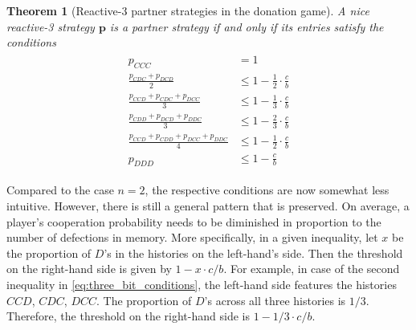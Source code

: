 \documentclass[9pt,twoside,lineno]{pnas-new}
\theoremstyle{plainCl1}
\newtheorem{theorem}{Theorem}
\newtheorem{corollary}{Corollary}
\theoremstyle{plainCl2}
\begin{document}
\begin{theorem}[Reactive-3 partner strategies in the donation game]\label{theorem:reactive_three_partner_strategies}
A nice reactive-3 strategy $\mathbf{p}$ is a partner strategy if and only if its entries satisfy the conditions
\begin{align}\label{eq:three_bit_conditions}
  \begin{split}
  p_{CCC} & = 1 \\
  \frac{p_{CDC} + p_{DCD}}{2} & \leq 1 - \frac{1}{2} \cdot \frac{c}{b} \\
  \frac{p_{CCD} + p_{CDC} + p_{DCC}}{3} & \leq 1 - \frac{1}{3} \cdot \frac{c}{b} \\
  \frac{p_{CDD} + p_{DCD} + p_{DDC}}{3} & \leq 1 - \frac{2}{3} \cdot \frac{c}{b} \\
  \frac{p_{CCD} + p_{CDD} + p_{DCC} + p_{DDC}}{4}  & \leq 1 - \frac{1}{2} \cdot \frac{c}{b}  \\
  p_{DDD} & \leq 1\!-\! \frac{c}{b}
  \end{split}
\end{align}
\end{theorem}

\noindent
Compared to the case $n\!=\!2$, the respective conditions are now somewhat less intuitive. 
However, there is still a general pattern that is preserved. 
On average, a player's cooperation probability needs to be diminished in proportion to the number of defections in memory. 
More specifically, in a given inequality, let $x$ be the proportion of $D$'s in the histories on the left-hand's side. 
Then the threshold on the right-hand side is given by $1-x\cdot c/b$. 
For example, in case of the second inequality in \eqref{eq:three_bit_conditions}, the left-hand side features the histories $CCD$, $CDC$, $DCC$. 
The proportion of $D$'s across all three histories is $1/3$. 
Therefore, the threshold on the right-hand side is $1-1/3\!\cdot\!c/b$. 

 

\end{document}
